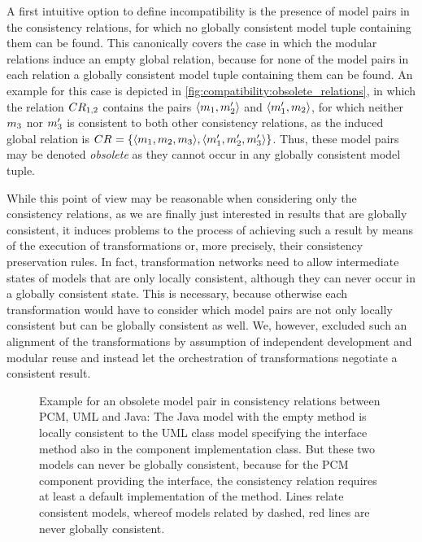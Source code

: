 A first intuitive option to define incompatibility is the presence of model pairs in the consistency relations, for which no globally consistent model tuple containing them can be found.
This canonically covers the case in which the modular relations induce an empty global relation, because for none of the model pairs in each relation a globally consistent model tuple containing them can be found.
An example for this case is depicted in \autoref{fig:compatibility:obsolete_relations}, in which the relation $\consistencyrelation{CR}{1,2}$ contains the pairs $\tupled{\model{m}{1}, \model{m}{2}'}$ and $\tupled{\model{m}{1}', \model{m}{2}}$, for which neither $\model{m}{3}$ nor $\model{m}{3}'$ is consistent to both other consistency relations, as the induced global relation is $\consistencyrelation{CR}{} = \setted{\tupled{\model{m}{1},\model{m}{2},\model{m}{3}},\tupled{\model{m}{1}',\model{m}{2}',\model{m}{3}'}}$.
Thus, these model pairs may be denoted \emph{obsolete} as they cannot occur in any globally consistent model tuple.

While this point of view may be reasonable when considering only the consistency relations, as we are finally just interested in results that are globally consistent, it induces problems to the process of achieving such a result by means of the execution of transformations or, more precisely, their consistency preservation rules.
In fact, transformation networks need to allow intermediate states of models that are only locally consistent, although they can never occur in a globally consistent state.
This is necessary, because otherwise each transformation would have to consider which model pairs are not only locally consistent but can be globally consistent as well.
We, however, excluded such an alignment of the transformations by assumption of independent development and modular reuse and instead let the orchestration of transformations negotiate a consistent result.

\begin{figure}
    \centering
    
    \caption[Concrete scenario with obsolete relation elements]{Example for an obsolete model pair in consistency relations between \acrshort{PCM}, \acrshort{UML} and Java: The Java model with the empty method is locally consistent to the \acrshort{UML} class model specifying the interface method also in the component implementation class. But these two models can never be globally consistent, because for the \acrshort{PCM} component providing the interface, the consistency relation requires at least a default implementation of the method. Lines relate consistent models, whereof models related by dashed, red lines are never globally consistent.}
    \label{fig:compatibility:obsolete_relations_scenario}
\end{figure}


